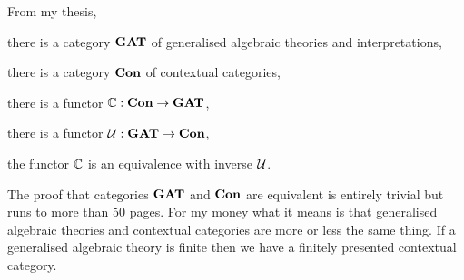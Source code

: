 
\note From my thesis, 
\begin{point}
there is a category $\catGAT$ of generalised algebraic theories and interpretations,
\end{point}
\begin{point}
there is a category $\catCon$ of contextual categories,
\end{point}
\begin{point}
there is a functor $\ccat[C]: \catCon \morph \catGAT$,
\end{point}
\begin{point}
there is a functor $\gat[U]:\catGAT \morph \catCon$,
\end{point}
\begin{point}
the functor $\ccat[C]$ is an equivalence with inverse $\gat[U]$.
\end{point}

\note
The proof that categories $\catGAT$ and $\catCon$ are equivalent  is entirely trivial but runs to more than 50 pages. For my money what it means is that generalised algebraic theories and contextual categories are more or less the same thing. If a generalised algebraic theory is finite then we have a finitely presented contextual category. 

